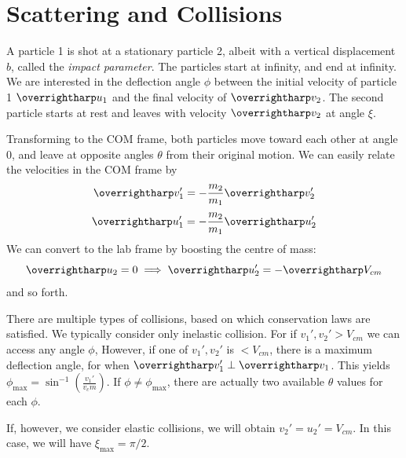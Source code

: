 \section{Scattering and Collisions}
A particle 1 is shot at a stationary particle 2, albeit with a vertical displacement \(b\), called the \emph{impact parameter}. The particles start at infinity, and end at infinity. We are interested in the deflection angle \(\phi\) between the initial velocity of particle 1 \(\vv{u_1}\) and the final velocity of \(\vv v_2\). The second particle starts at rest and leaves with velocity \(\vv v_2\) at angle \(\xi\). 

Transforming to the COM frame, both particles move toward each other at angle \(0\), and leave at opposite angles \(\theta\) from their original motion. We can easily relate the velocities in the COM frame by
\[\vv v_1' = -\frac{m_2}{m_1}\vv v_2'\]
\[\vv u_1' = -\frac{m_2}{m_1}\vv u_2'\]
We can convert to the lab frame by boosting the centre of mass:
\[\vv{u}_2=0\then \vv{u}_2' = -\vv{V}_{cm}\]
and so forth.

There are multiple types of collisions, based on which conservation laws are satisfied. We typically consider only inelastic collision. For if \(v_1',v_2'>V_{cm}\) we can access any angle \(\phi\), However, if one of \(v_1',v_2'\) is \(<V_{cm}\), there is a maximum deflection angle, for when \(\vv v_1'\perp \vv v_1\). This yields \(\phi_{\max} = \sin^{-1}\left(\frac{v_1'}{v_cm}\right)\). If \(\phi\neq\phi_{\max}\), there are actually two available \(\theta\) values for each \(\phi\).

If, however, we consider elastic collisions, we will obtain \(v_2'=u_2'=V_{cm}\). In this case, we will have \(\xi_{\max} = \pi/2\).

